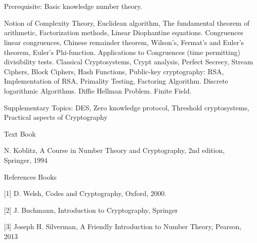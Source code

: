 \section{\courseinfo}

Prerequisite: Basic knowledge number theory.  

Notion of Complexity Theory, Euclidean algorithm, The fundamental theorem of arithmetic, Factorization methods, Linear Diophantine equations. Congruences linear congruences, Chinese remainder theorem, Wilson’s, Fermat’s and Euler’s theorem, Euler’s Phi-function. Applications to Congruences (time permitting) divisibility tests. Classical Cryptosystems, Crypt analysis, Perfect Secrecy, Stream Ciphers, Block Ciphers, Hash Functions, Public-key cryptography: RSA, Implementation of RSA, Primality Testing, Factoring Algorithm. Discrete logarithmic Algorithms. Diffie Hellman Problem. Finite Field.

Supplementary Topics: DES, Zero knowledge protocol, Threshold cryptosystems, Practical aspects of Cryptography
	
Text Book

N. Koblitz, A Course in Number Theory and Cryptography, 2nd edition, Springer, 1994

References Books 

[1] D. Welsh, Codes and Cryptography, Oxford, 2000.

[2] J. Buchmann, Introduction to Cryptography, Springer

[3] Joseph H. Silverman, A Friendly Introduction to Number Theory, Pearson, 2013
